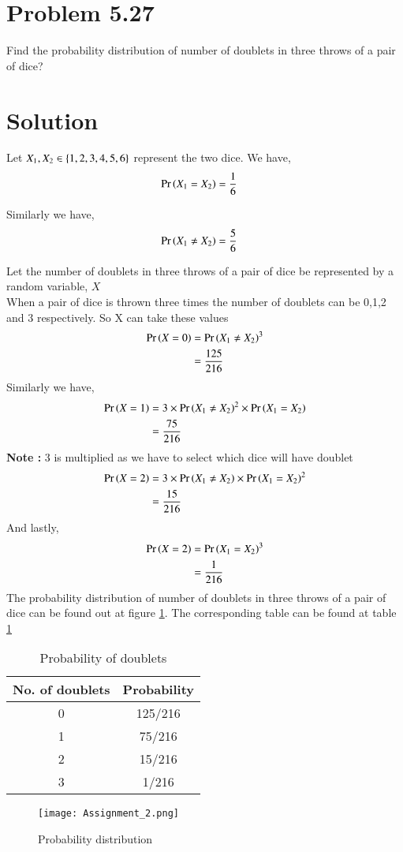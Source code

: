 \documentclass[journal,12pt,twocolumn]{IEEEtran}
\begin{document}
\section*{Problem 5.27}
Find the probability distribution of number of doublets in three throws of a pair of dice?
\section*{Solution}
Let $X_1, X_2 \in \left\{1, 2, 3, 4, 5, 6 \right\} $ represent the two dice.
We have,
\begin{align}
    \Pr\left(X_1 =X_2\right) &= \frac{1}{6}
\end{align}

Similarly we have, 
\begin{align}
    \Pr\left(X_1 \neq X_2\right) &= \frac{5}{6}
\end{align}

Let the number of doublets in three throws of a pair of dice be represented by a random variable, $X$ \\
When a pair of dice is thrown three times the number of doublets can be 0,1,2 and 3 respectively. So X can take these values
\begin{align}
    \Pr\left(X =0\right) &= {\Pr\left(X_1 \neq X_2\right)}^3   \\
        & = \dfrac{125}{216}
\end{align}
Similarly we have, 
\begin{align}
    \Pr\left(X =1\right) &= 3 \times {\Pr\ensuremath{\left(X_1 \neq X_2\right)}}^2 \times \Pr\left(X_1 = X_2\right)   \\
        & = \dfrac{75}{216}
\end{align}
\textbf{Note :} 3 is multiplied as we have to select which dice will have doublet
\begin{align}
    \Pr\left(X =2\right) &= 3 \times \Pr\left(X_1 \neq X_2\right) \times {\Pr\ensuremath{\left(X_1 = X_2\right)}}^2 \\
        & = \dfrac{15}{216}
\end{align}
And lastly,
\begin{align}
    \Pr\left(X =2\right) &= {\Pr\left(X_1 = X_2\right)}^3   \\
        & = \dfrac{1}{216}
\end{align}
The probability distribution of number of doublets in three throws of a pair of dice can be found out at figure \ref{Probability distribution}. The corresponding table can be found at table  \ref{tab:Probability of doublets} 
\begin{table}[hbt!]
\centering
\begin{tabular}{|c|c|}
\hline
\textbf{No. of doublets} & \textbf{Probability} \\ \hline
0                        & 125/216                    \\ \hline
1                        & 75/216                    \\ \hline
2                        & 15/216               \\ \hline
3                        & 1/216                    \\ \hline
\end{tabular}
\caption{Probability of doublets}
\label{tab:Probability of doublets}
\end{table}

\begin{figure}[h!]
    \centering
    \texttt{[image: Assignment\_2.png]}
    \caption{Probability distribution}
    \label{Probability distribution}
\end{figure}
\end{document}
